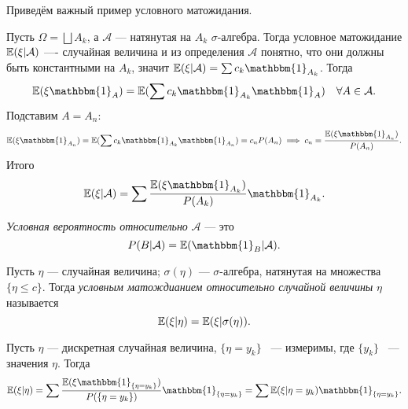  Приведём важный пример условного матожидания. 

 \begin{example}
    Пусть $\Omega = \bigsqcup A_k$, а $\mathcal{A}$ --- натянутая на $A_k$ $\sigma$-алгебра.
    Тогда условное матожидание
     $\mathbb{E} (\xi | \mathcal{A})$ ---- случайная величина  и из определения $\mathcal{A}$ понятно, что они должны быть константными на $A_k$, значит $\EE (\xi | \mathcal{A}) = \sum c_k \mathbbm{1}_{A_k}$. Тогда
     $$\EE (\xi \mathbbm{1}_A) = \EE (\sum c_k \mathbbm{1}_{A_k} \mathbbm{1}_A) \quad \forall A\in \mathcal{A}.$$ Подставим $A = A_n$:
     $$\EE (\xi\mathbbm{1}_{A_n}) = \EE (\sum c_k \mathbbm{1}_{A_k} \mathbbm{1}_{A_n}) = c_n P(A_n) \Ra  c_n = \frac{\EE (\xi\mathbbm{1}_{A_n})}{P(A_n)}.$$
     Итого
     $$\EE (\xi | \mathcal{A}) = \sum \frac{\EE (\xi\mathbbm{1}_{A_k})}{P(A_k)} \mathbbm{1}_{A_k}.$$
 \end{example}

 \begin{definition}
     \textit{Условная вероятность относительно} $\mathcal{A}$ --- это
     $$P(B | \mathcal{A} ) = \EE (\mathbbm{1}_B | \mathcal{A}).$$
 \end{definition}

 \begin{definition}
     Пусть $\eta$ --- случайная величина; $\sigma(\eta)$ --- $\sigma$-алгебра, натянутая на множества $\{\eta \le c\}$. Тогда \textit{условным матождианием относительно случайной величины} $\eta$ называется
     $$\mathbb{E} (\xi | \eta) = \mathbb{E} (\xi | \sigma(\eta)).$$
 \end{definition}

 \begin{example}
     Пусть $\eta$ --- дискретная случайная величина, $\{\eta = y_k\}$ ~--- измеримы, где $\{y_k\}$ ~--- значения $\eta$. Тогда
     $$\EE (\xi | \eta) = \sum \frac{\EE (\xi \mathbbm{1}_{\{\eta = y_k\}})}{P(\{\eta = y_k\})} \mathbbm{1}_{\{\eta = y_k\}} =
         \sum \EE (\xi | \eta = y_k)\mathbbm{1}_{\{\eta = y_k\}}.$$
 \end{example}\newpage
